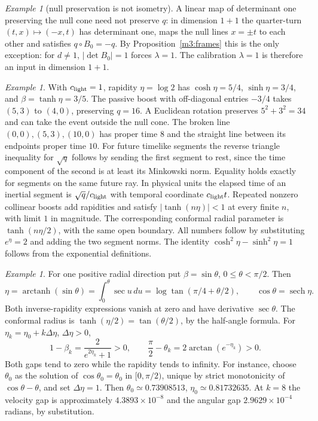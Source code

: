 \documentclass[11pt,reqno]{amsart}
\theoremstyle{definition}
\theoremstyle{remark}
\newtheorem{example}[theorem]{Example}
\numberwithin{equation}{section}
\begin{document}
\begin{example}[null preservation is not isometry]\label{m3:quarterturn}
A linear map of determinant one preserving the null cone need not preserve $q$: in dimension $1+1$ the quarter-turn
$(t,x)\mapsto(-x,t)$ has determinant one, maps the null lines $x=\pm t$ to each other and satisfies $q\circ B_0=-q$.  By
Proposition~\ref{m3:frames} this is the only exception: for $d\ne1$, $|\det B_0|=1$ forces $\lambda=1$.  The calibration $\lambda=1$ is
therefore an input in dimension $1+1$.
\end{example}

\begin{example}\label{m3:proper}
With \(c_{\rm light}=1\), rapidity \(\eta=\log 2\) has
\(\cosh\eta=5/4\), \(\sinh\eta=3/4\), and \(\beta=\tanh\eta=3/5\).
The passive boost with off-diagonal entries \(-3/4\) takes
\((5,3)\) to \((4,0)\), preserving \(q=16\). A Euclidean rotation
preserves \(5^2+3^2=34\) and can take the event outside the null cone.
The broken line \((0,0),(5,3),(10,0)\) has proper time \(8\)
and the straight line between its endpoints proper time \(10\).
For future timelike segments the reverse triangle inequality for
\(\sqrt q\) follows by sending the first segment to rest, since the
time component of the second is at least its Minkowski norm.
Equality holds exactly for segments on the same future ray. In
physical units the elapsed time of an inertial segment is
\(\sqrt{q}/c_{\rm light}\) with temporal coordinate \(c_{\rm light}t\).
Repeated nonzero collinear boosts add rapidities and satisfy
\(|\tanh(n\eta)|<1\) at every finite \(n\), with limit \(1\) in
magnitude. The corresponding conformal radial parameter is
\(\tanh(n\eta/2)\), with the same open boundary.
All numbers follow by substituting \(e^\eta=2\) and adding the two
segment norms. The identity \(\cosh^2\eta-\sinh^2\eta=1\) follows
from the exponential definitions.
\end{example}

\begin{example}\label{m3:rapidityBoundary}
For one positive radial direction put \(\beta=\sin\theta\),
\(0\le\theta<\pi/2\). Then
\[
 \eta=\operatorname{arctanh}(\sin\theta)
     =\int_0^\theta\sec u\,du
     =\log\tan(\pi/4+\theta/2),\qquad
 \cos\theta=\operatorname{sech}\eta .
\]
Both inverse-rapidity expressions vanish at zero and have
derivative \(\sec\theta\). The conformal radius is
\(\tanh(\eta/2)=\tan(\theta/2)\), by the half-angle formula.
For \(\eta_k=\eta_0+k\Delta\eta\), \(\Delta\eta>0\),
\[
 1-\beta_k=\frac{2}{e^{2\eta_k}+1}>0,\qquad
 \frac{\pi}{2}-\theta_k=2\arctan(e^{-\eta_k})>0.
\]
Both gaps tend to zero while the rapidity tends to infinity.
For instance, choose \(\theta_0\) as the solution of
\(\cos\theta_0=\theta_0\) in \([0,\pi/2)\), unique by strict
monotonicity of \(\cos\theta-\theta\), and set \(\Delta\eta=1\).
Then \(\theta_0\simeq0.73908513\), \(\eta_0\simeq0.81732635\).
At \(k=8\) the velocity gap is approximately
\(4.3893\times10^{-8}\) and the angular gap
\(2.9629\times10^{-4}\) radians, by substitution.
\end{example}
\end{document}

